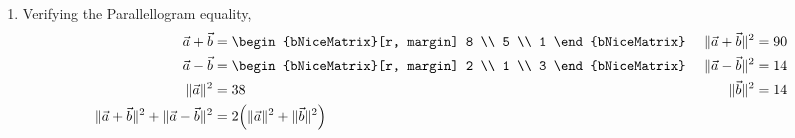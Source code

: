 \begin{enumerate}
    \item Verifying the Parallellogram equality,
          \begin{align}
              \vec{a} + \vec{b}                   & = \begin{bNiceMatrix}[r, margin]
                                                          8 \\ 5 \\ 1
                                                      \end{bNiceMatrix} &
              \lVert \vec{a} + \vec{b} \rVert^2   & = 90                               \\
              \vec{a} - \vec{b}                   & = \begin{bNiceMatrix}[r, margin]
                                                          2 \\ 1 \\ 3
                                                      \end{bNiceMatrix} & \
              \lVert \vec{a} - \vec{b} \rVert^2   & = 14                               \\
              \lVert \vec{a} \rVert^2             & = 38                             &
              \lVert \vec{b} \rVert^2             & = 14                               \\
              \lVert \vec{a} + \vec{b} \rVert^2
              + \lVert \vec{a} - \vec{b} \rVert^2 &
              = 2\Big(\lVert \vec{a} \rVert^2 + \lVert \vec{b} \rVert^2 \Big)
          \end{align}
\end{enumerate}